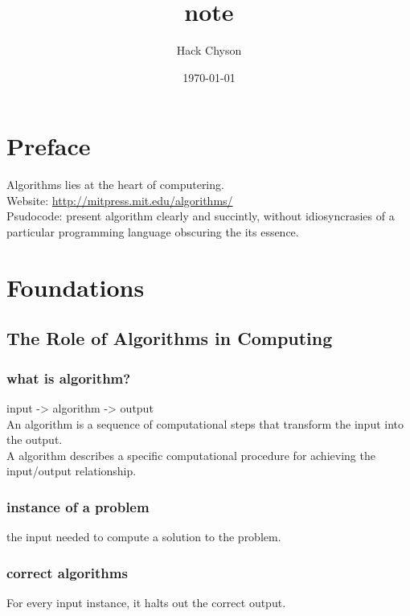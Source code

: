 \documentclass[11pt]{article}
\author{Hack Chyson}
\date{\today}
\title{note}
\begin{document}
\maketitle
\tableofcontents

\section{Preface}
\label{sec-1}
Algorithms lies at the heart of computering. \\

Website: \url{http://mitpress.mit.edu/algorithms/} \\

Psudocode: present algorithm clearly and succintly, without idiosyncrasies of a particular programming language obscuring the its essence. \\

\section{Foundations}
\label{sec-2}
\subsection{The Role of Algorithms in Computing}
\label{sec-2-1}
\subsubsection{what is algorithm?}
\label{sec-2-1-1}
input -> algorithm -> output \\
An algorithm is a sequence of computational steps that transform the input into the output. \\
A algorithm describes a specific computational procedure for achieving the input/output relationship. \\

\subsubsection{instance of a problem}
\label{sec-2-1-2}
the input needed to compute a solution to the problem. \\

\subsubsection{correct algorithms}
\label{sec-2-1-3}
For every input instance, it halts out the correct output. \\
\end{document}
